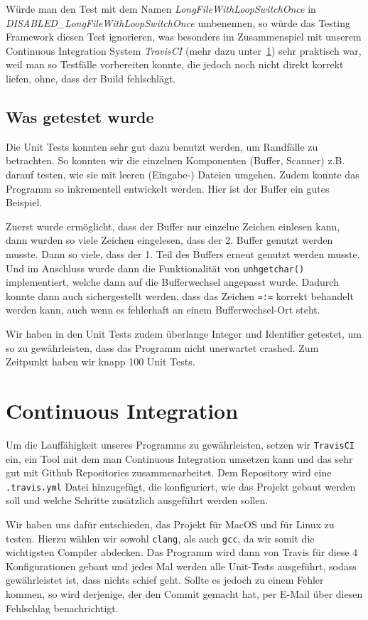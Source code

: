 Würde man den Test mit dem Namen \emph{LongFileWithLoopSwitchOnce} in \emph{DISABLED\-\_LongFileWithLoopSwitchOnce} umbenennen, so würde das Testing Framework diesen Test ignorieren, was besonders im Zusammenspiel mit unserem Continuous Integration System \textit{TravisCI} (mehr dazu unter~\ref{sec:ContinousIntegration}) sehr praktisch war, weil man so Testfälle vorbereiten konnte, die jedoch noch nicht direkt korrekt liefen, ohne, dass der Build fehlschlägt.

\subsection{Was getestet wurde}
Die Unit Tests konnten sehr gut dazu benutzt werden, um Randfälle zu betrachten. So konnten wir die einzelnen Komponenten (Buffer, Scanner) z.B. darauf testen, wie sie mit leeren (Eingabe-) Dateien umgehen. Zudem konnte das Programm so inkrementell entwickelt werden. Hier ist der Buffer ein gutes Beispiel.

Zuerst wurde ermöglicht, dass der Buffer nur einzelne Zeichen einlesen kann, dann wurden so viele Zeichen eingelesen, dass der 2. Buffer genutzt werden musste. Dann so viele, dass der 1. Teil des Buffers erneut genutzt werden musste. Und im Anschluss wurde dann die Funktionalität von \texttt{unhgetchar()} implementiert, welche dann auf die Bufferwechsel angepasst wurde. Dadurch konnte dann auch sichergestellt werden, dass das Zeichen \texttt{=:=} korrekt behandelt werden kann, auch wenn es fehlerhaft an einem Bufferwechsel-Ort steht.

Wir haben in den Unit Tests zudem überlange Integer und Identifier getestet, um so zu gewährleisten, dass das Programm nicht unerwartet crashed. Zum Zeitpunkt haben wir knapp 100 Unit Tests.

\section{Continuous Integration}\label{sec:ContinousIntegration}
Um die Lauffähigkeit unseres Programms zu gewährleisten, setzen wir \texttt{TravisCI} ein, ein Tool mit dem man Continuous Integration umsetzen kann und das sehr gut mit Github Repositories zusammenarbeitet. Dem Repository wird eine \texttt{.travis.yml} Datei hinzugefügt, die konfiguriert, wie das Projekt gebaut werden soll und welche Schritte zusätzlich ausgeführt werden sollen.

Wir haben uns dafür entschieden, das Projekt für MacOS und für Linux zu testen. Hierzu wählen wir sowohl \texttt{clang}, als auch \texttt{gcc}, da wir somit die wichtigsten Compiler abdecken. Das Programm wird dann von Travis für diese 4 Konfigurationen gebaut und jedes Mal werden alle Unit-Tests ausgeführt, sodass gewährleistet ist, dass nichts schief geht. Sollte es jedoch zu einem Fehler kommen, so wird derjenige, der den Commit gemacht hat, per E-Mail über diesen Fehlschlag benachrichtigt.
